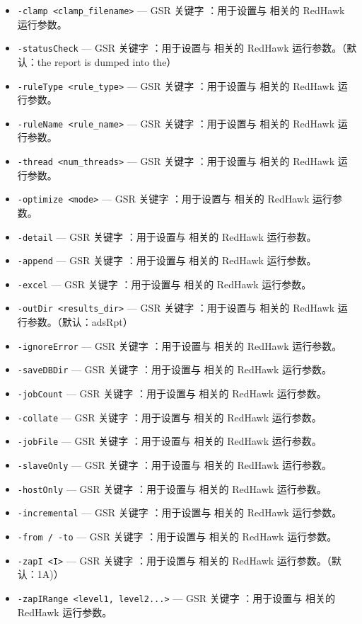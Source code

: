 \begin{itemize}
\item \texttt{-clamp <clamp\_filename>} — GSR 关键字 ：用于设置与  相关的 RedHawk 运行参数。
\item \texttt{-statusCheck} — GSR 关键字 ：用于设置与  相关的 RedHawk 运行参数。（默认：the report is dumped into the）
\item \texttt{-ruleType <rule\_type>} — GSR 关键字 ：用于设置与  相关的 RedHawk 运行参数。
\item \texttt{-ruleName <rule\_name>} — GSR 关键字 ：用于设置与  相关的 RedHawk 运行参数。
\item \texttt{-thread <num\_threads>} — GSR 关键字 ：用于设置与  相关的 RedHawk 运行参数。
\item \texttt{-optimize <mode>} — GSR 关键字 ：用于设置与  相关的 RedHawk 运行参数。
\item \texttt{-detail} — GSR 关键字 ：用于设置与  相关的 RedHawk 运行参数。
\item \texttt{-append} — GSR 关键字 ：用于设置与  相关的 RedHawk 运行参数。
\item \texttt{-excel} — GSR 关键字 ：用于设置与  相关的 RedHawk 运行参数。
\item \texttt{-outDir <results\_dir>} — GSR 关键字 ：用于设置与  相关的 RedHawk 运行参数。（默认：adsRpt）
\item \texttt{-ignoreError} — GSR 关键字 ：用于设置与  相关的 RedHawk 运行参数。
\item \texttt{-saveDBDir} — GSR 关键字 ：用于设置与  相关的 RedHawk 运行参数。
\item \texttt{-jobCount} — GSR 关键字 ：用于设置与  相关的 RedHawk 运行参数。
\item \texttt{-collate} — GSR 关键字 ：用于设置与  相关的 RedHawk 运行参数。
\item \texttt{-jobFile} — GSR 关键字 ：用于设置与  相关的 RedHawk 运行参数。
\item \texttt{-slaveOnly} — GSR 关键字 ：用于设置与  相关的 RedHawk 运行参数。
\item \texttt{-hostOnly} — GSR 关键字 ：用于设置与  相关的 RedHawk 运行参数。
\item \texttt{-incremental} — GSR 关键字 ：用于设置与  相关的 RedHawk 运行参数。
\item \texttt{-from / -to} — GSR 关键字 ：用于设置与  相关的 RedHawk 运行参数。
\item \texttt{-zapI <I>} — GSR 关键字 ：用于设置与  相关的 RedHawk 运行参数。（默认：1A)）
\item \texttt{-zapIRange <level1, level2...>} — GSR 关键字 ：用于设置与  相关的 RedHawk 运行参数。

\end{itemize}
